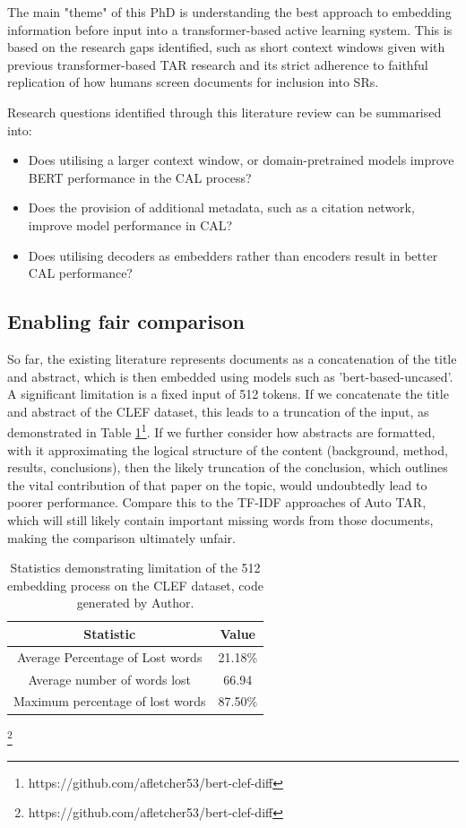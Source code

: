 \documentclass[../main.tex]{subfiles}
\begin{document}
The main "theme" of this PhD is understanding the best approach to embedding information before input into a transformer-based active learning system.  This is based on the research gaps identified, such as short context windows given with previous transformer-based TAR research and its strict adherence to faithful replication of how humans screen documents for inclusion into SRs.  

Research questions identified through this literature review can be summarised into:
\begin{itemize}
    \item Does utilising a larger context window, or domain-pretrained models improve BERT performance in the CAL process?
    \item Does the provision of additional metadata, such as a citation network, improve model performance in CAL?
    \item Does utilising decoders as embedders rather than encoders result in better CAL performance?
\end{itemize}

\subsection{Enabling fair comparison}

So far, the existing literature represents documents as a concatenation of the title and abstract, which is then embedded using models such as 'bert-based-uncased'. A significant limitation is a fixed input of 512 tokens. If we concatenate the title and abstract of the CLEF dataset, this leads to a truncation of the input, as demonstrated in Table \ref{tab:clef_token_limits}\footnote{https://github.com/afletcher53/bert-clef-diff}.  If we further consider how abstracts are formatted, with it approximating the logical structure of the content (background, method, results, conclusions), then the likely truncation of the conclusion, which outlines the vital contribution of that paper on the topic, would undoubtedly lead to poorer performance. Compare this to the TF-IDF approaches of Auto TAR, which will still likely contain important missing words from those documents, making the comparison ultimately unfair. 

\begin{table}
    \centering
    \begin{tabular}{|c|c|}
        \hline
        Statistic & Value  \\ \hline
         Average Percentage of Lost words & 21.18\%  \\ \hline
         Average number of words lost &  66.94 \\ \hline
        Maximum percentage of lost words &  87.50\% \\\hline
    \end{tabular}
    \caption{Statistics demonstrating limitation of the 512 embedding process on the CLEF dataset, code generated by Author.}\footnote{https://github.com/afletcher53/bert-clef-diff} 
    \label{tab:clef_token_limits}
\end{table}
\end{document}
